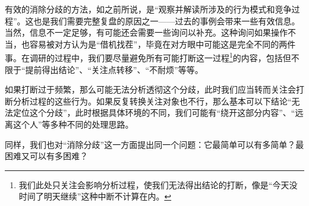 \begin{explain}
有效的消除分歧的方法，如之前所说，是“观察并解读所涉及的行为模式和竞争过程”。这也是我们需要完整复盘的原因之一——过去的事例会带来一些有效信息。当然，信息不一定足够，有可能还会需要一些询问以补充。这种询问如果操作不当，也容易被对方认为是“借机找茬”，毕竟在对方眼中可能这是完全不同的两件事。在调研的过程中，我们要尽量避免所有可能打断这一过程\footnote{我们此处只关注会影响分析过程，使我们无法得出结论的打断，像是“今天没时间了明天继续”这种中断不计算在内。}的内容，包括但不限于“提前得出结论”、“关注点转移”、“不耐烦”等等。

如果打断过于频繁，那么可能无法分析透彻这个分歧，此时我们应当转而关注会打断分析过程的这些行为。如果反复转换关注对象也不行，那么基本可以下结论“无法定位这个分歧”，此时根据具体环境的不同，我们可能有“绕开这部分内容”、“远离这个人”等多种不同的处理思路。
\end{explain}

\divider

同样，我们也对“消除分歧”这一方面提出同一个问题：它最简单可以有多简单？最困难又可以有多困难？

